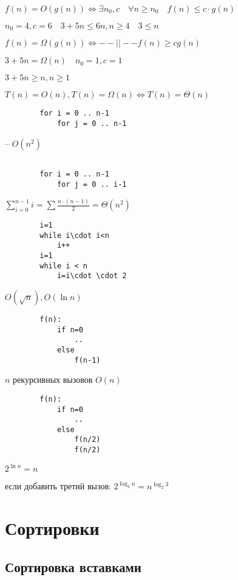 \documentclass{book}
\theoremstyle{definition}
\begin{document}
    $f(n) = O(g(n)) \iff \exists n_0, c\quad \forall n\geqslant n_0\quad f(n)\leqslant c\cdot g(n)$

    $n_0 = 4, c = 6\quad 3+5n\leqslant 6n, n\geqslant 4\quad 3\leqslant n$

    $f(n) = \Omega (g(n)) \iff --||-- f(n) \geqslant c g(n)$

    $3+5n = \Omega(n)\quad n_0 =1, c=1$

    $3+5n \geqslant n, n\geqslant 1$

    $T(n) = O(n), T(n) = \Omega(n) \iff T(n) = \Theta(n)$

    \begin{verbatim}
        for i = 0 .. n-1
            for j = 0 .. n-1
        \end{verbatim}
        -- $O(n^2)$

    \begin{verbatim}
    
        for i = 0 .. n-1
            for j = 0 .. i-1
    \end{verbatim}

    $\sum_{i=0}^{n-1} i =\sum  \frac{n\cdot (n-1)}{2} = \Theta(n^2)$

    \begin{verbatim}
        i=1
        while i\cdot i<n
            i++
        i=1
        while i < n
            i=i\cdot \cdot 2
    \end{verbatim}

    $O(\sqrt{n}), O(\ln n) $

    \begin{verbatim}
        f(n):
            if n=0
                ..
            else
                f(n-1)
    \end{verbatim}

    $n$ рекурсивных вызовов $O(n)$


    \begin{verbatim}
        f(n):
            if n=0
                ..
            else
                f(n/2)
                f(n/2)
    \end{verbatim}

    $2^{\ln  n} = n$

    если добавить третий вызов: $2^{\log_2 n} = n^{\log_2 3}$

    \section{Сортировки}
    \subsection{Сортировка вставками}
\end{document}
